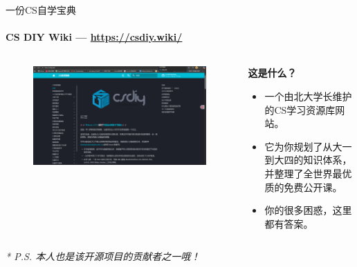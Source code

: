 \documentclass{beamer}
\newcommand{\hrefcol}[2]{\textcolor{cyan}{\href{#1}{#2}}}
\begin{document}
\begin{frame}{一份CS自学宝典}
    \framesubtitle{CS DIY Wiki --- \hrefcol{https://csdiy.wiki/}{https://csdiy.wiki/}}

    \begin{columns}[T]
        \begin{column}{0.45\textwidth}
            \begin{figure}
                \includegraphics[width=\textwidth]{assets/cs.png}
            \end{figure}
        \end{column}

        \begin{column}{0.55\textwidth}
            \Large \textbf{这是什么？}
            \begin{itemize}
                \item 一个由北大学长维护的CS学习资源库网站。
                \item 它为你规划了从大一到大四的知识体系，并整理了全世界\alert{最优质}的免费公开课。
                \item 你的很多困惑，这里都有答案。
            \end{itemize}
        \end{column}
    \end{columns}

\begin{flushright}
    \small\textit{* P.S. 本人也是该开源项目的贡献者之一哦！}
\end{flushright}
    
\end{frame}
\end{document}
